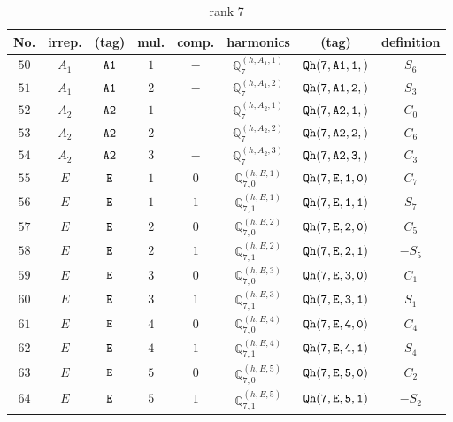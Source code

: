 \documentclass[fleqn,8pt]{jsarticle}
\begin{document}
\begin{table}[ht!]
\begin{center}
\caption{rank 7}
\renewcommand{\arraystretch}{1.3}
\begin{tabular}{cccccccc} \hline \hline
No. & irrep. & (tag) & mul. & comp. & harmonics & (tag) & definition \\ \hline
$ 50 $ & $ A_{1} $ & $ {\tt A1} $ & $ 1 $ & $ - $ & $ \mathbb{Q}_{7}^{(h,A_{1},1)} $ & $ {\tt Qh(7,A1,1,)} $ & $ S_{6} $ \\
$ 51 $ & $ A_{1} $ & $ {\tt A1} $ & $ 2 $ & $ - $ & $ \mathbb{Q}_{7}^{(h,A_{1},2)} $ & $ {\tt Qh(7,A1,2,)} $ & $ S_{3} $ \\
$ 52 $ & $ A_{2} $ & $ {\tt A2} $ & $ 1 $ & $ - $ & $ \mathbb{Q}_{7}^{(h,A_{2},1)} $ & $ {\tt Qh(7,A2,1,)} $ & $ C_{0} $ \\
$ 53 $ & $ A_{2} $ & $ {\tt A2} $ & $ 2 $ & $ - $ & $ \mathbb{Q}_{7}^{(h,A_{2},2)} $ & $ {\tt Qh(7,A2,2,)} $ & $ C_{6} $ \\
$ 54 $ & $ A_{2} $ & $ {\tt A2} $ & $ 3 $ & $ - $ & $ \mathbb{Q}_{7}^{(h,A_{2},3)} $ & $ {\tt Qh(7,A2,3,)} $ & $ C_{3} $ \\
$ 55 $ & $ E $ & $ {\tt E} $ & $ 1 $ & $ 0 $ & $ \mathbb{Q}_{7,0}^{(h,E,1)} $ & $ {\tt Qh(7,E,1,0)} $ & $ C_{7} $ \\
$ 56 $ & $ E $ & $ {\tt E} $ & $ 1 $ & $ 1 $ & $ \mathbb{Q}_{7,1}^{(h,E,1)} $ & $ {\tt Qh(7,E,1,1)} $ & $ S_{7} $ \\
$ 57 $ & $ E $ & $ {\tt E} $ & $ 2 $ & $ 0 $ & $ \mathbb{Q}_{7,0}^{(h,E,2)} $ & $ {\tt Qh(7,E,2,0)} $ & $ C_{5} $ \\
$ 58 $ & $ E $ & $ {\tt E} $ & $ 2 $ & $ 1 $ & $ \mathbb{Q}_{7,1}^{(h,E,2)} $ & $ {\tt Qh(7,E,2,1)} $ & $ - S_{5} $ \\
$ 59 $ & $ E $ & $ {\tt E} $ & $ 3 $ & $ 0 $ & $ \mathbb{Q}_{7,0}^{(h,E,3)} $ & $ {\tt Qh(7,E,3,0)} $ & $ C_{1} $ \\
$ 60 $ & $ E $ & $ {\tt E} $ & $ 3 $ & $ 1 $ & $ \mathbb{Q}_{7,1}^{(h,E,3)} $ & $ {\tt Qh(7,E,3,1)} $ & $ S_{1} $ \\
$ 61 $ & $ E $ & $ {\tt E} $ & $ 4 $ & $ 0 $ & $ \mathbb{Q}_{7,0}^{(h,E,4)} $ & $ {\tt Qh(7,E,4,0)} $ & $ C_{4} $ \\
$ 62 $ & $ E $ & $ {\tt E} $ & $ 4 $ & $ 1 $ & $ \mathbb{Q}_{7,1}^{(h,E,4)} $ & $ {\tt Qh(7,E,4,1)} $ & $ S_{4} $ \\
$ 63 $ & $ E $ & $ {\tt E} $ & $ 5 $ & $ 0 $ & $ \mathbb{Q}_{7,0}^{(h,E,5)} $ & $ {\tt Qh(7,E,5,0)} $ & $ C_{2} $ \\
$ 64 $ & $ E $ & $ {\tt E} $ & $ 5 $ & $ 1 $ & $ \mathbb{Q}_{7,1}^{(h,E,5)} $ & $ {\tt Qh(7,E,5,1)} $ & $ - S_{2} $ \\
 \hline \hline
\end{tabular}
\end{center}
\end{table}
\end{document}
